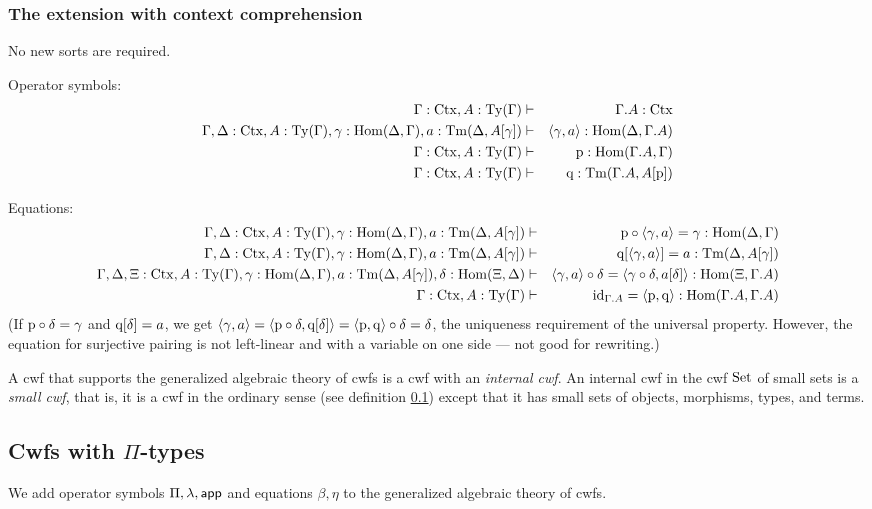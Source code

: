 \documentclass{lmcs}
\def\Ctx{\mathrm{Ctx}}
\def\Hom{\mathrm{Hom}}
\def\id{\mathrm{id}}
\begin{document}
\subsubsection{The extension with context comprehension}

No new sorts are required.
  
Operator symbols:
\begin{eqnarray*}
\Gamma : \Ctx, A:\Ty(\Gamma) &\vdash& \Gamma\cext A : \Ctx\\
\Gamma,\Delta : \Ctx, A:\Ty(\Gamma), \gamma : \Hom(\Delta,\Gamma), a:\Tm(\Delta,A[\gamma]) &\vdash& \tuple{\gamma,a} : \Hom(\Delta,\Gamma\cext A)\\
\Gamma : \Ctx, A:\Ty(\Gamma) &\vdash& \p: \Hom(\Gamma\cext A,\Gamma)\\
\Gamma : \Ctx, A:\Ty(\Gamma) &\vdash& \q: \Tm(\Gamma\cext A,A[\p])
\end{eqnarray*}

Equations:
\begin{eqnarray*}
\Gamma,\Delta : \Ctx, A:\Ty(\Gamma), \gamma : \Hom(\Delta,\Gamma), a:\Tm(\Delta,A[\gamma]) &\vdash& \p\circ\tuple{\gamma,a} = \gamma : \Hom(\Delta,\Gamma)\\
\Gamma,\Delta : \Ctx, A:\Ty(\Gamma), \gamma : \Hom(\Delta,\Gamma), a:\Tm(\Delta,A[\gamma]) &\vdash& \q[\tuple{\gamma,a}] = a : \Tm(\Delta,A[\gamma]) \\
\Gamma,\Delta,\Xi : \Ctx, A:\Ty(\Gamma), \gamma : \Hom(\Delta,\Gamma), a:\Tm(\Delta,A[\gamma]), \delta : \Hom(\Xi,\Delta) &\vdash& 
\tuple{\gamma,a} \circ \delta = \tuple{\gamma\circ\delta,a[\delta]} : 
\Hom(\Xi,\Gamma\cext A) \\
\Gamma : \Ctx, A:\Ty(\Gamma) &\vdash& 
\id_{\Gamma\cext A} = \tuple{\p,\q} : \Hom(\Gamma\cext A,\Gamma\cext A)
\end{eqnarray*}
(If $\mathrm{p}\circ\delta = \gamma$ and $\mathrm{q}[\delta]=a$, we get
$\langle \gamma,a \rangle=\langle \mathrm{p}\circ\delta, \mathrm{q}[\delta] \rangle = \langle \mathrm{p},\mathrm{q} \rangle\circ\delta =
\delta$, the uniqueness requirement of the universal property.
However, the equation for surjective pairing is not left-linear and with
a variable on one side --- not good for rewriting.)

A cwf that supports the generalized algebraic theory of cwfs is a cwf with an {\em internal cwf}. An internal cwf in the cwf ${\rm Set}$ of small sets is a {\em small cwf}, that is, it is a cwf in the ordinary sense (see definition \ref{}) except that it has small sets of objects, morphisms, types, and terms.

\subsection{Cwfs with $\Pi$-types} 
We add operator symbols $\Pi, \lambda, \mathsf{app}$ and equations $\beta, \eta$ to the generalized algebraic theory of cwfs. 
\end{document}
